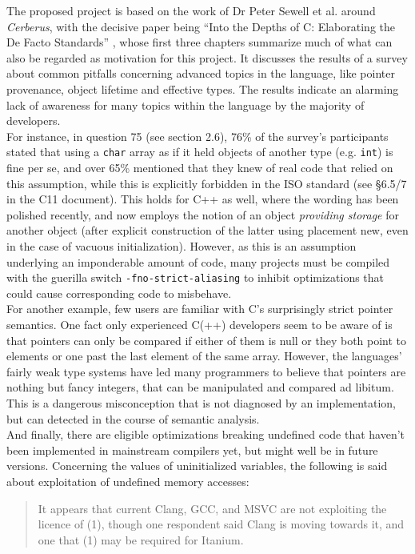 \documentclass[12pt]{article}
\begin{document}
The proposed project is based on the work of Dr Peter Sewell et al. around \emph{Cerberus}, with the decisive paper being ``Into the Depths of C: Elaborating the De Facto Standards'' \cite{1}, whose first three chapters summarize much of what can also be regarded as motivation for this project. It discusses the results of a survey about common pitfalls concerning advanced topics in the language, like pointer provenance, object lifetime and effective types. The results indicate an alarming lack of awareness for many topics within the language by the majority of developers. \\
For instance, in question 75 (see section 2.6), 76\% of the survey's participants stated that using a \texttt{char} array as if it held objects of another type (e.g. \texttt{int}) is fine per se, and over 65\% mentioned that they knew of real code that relied on this assumption, while this is explicitly forbidden in the ISO standard (see \S 6.5/7 in the C11 document). This holds for C++ as well, where the wording has been polished recently, and now employs the notion of an object \emph{providing storage} for another object (after explicit construction of the latter using placement new, even in the case of vacuous initialization). However, as this is an assumption underlying an imponderable amount of code, many projects must be compiled with the guerilla switch \texttt{-fno-strict-aliasing} to inhibit optimizations that could cause corresponding code to misbehave.\\
For another example, few users are familiar with C's surprisingly strict pointer semantics. One fact only experienced C(++) developers seem to be aware of is that pointers can only be compared if either of them is null or they both point to elements or one past the last element of the same array. However, the languages' fairly weak type systems have led many programmers to believe that pointers are nothing but fancy integers, that can be manipulated and compared ad libitum. This is a dangerous misconception that is not diagnosed by an implementation, but can detected in the course of semantic analysis.\\
And finally, there are eligible optimizations breaking undefined code that haven't been implemented in mainstream compilers yet, but might well be in future versions. Concerning the values of uninitialized variables, the following is said about exploitation of undefined memory accesses:
\begin{quote}
	It appears that current Clang, GCC, and MSVC
	are not exploiting the licence of (1), though one respondent
	said Clang is moving towards it, and one that (1) may be
	required for Itanium.
\end{quote}
\end{document}
